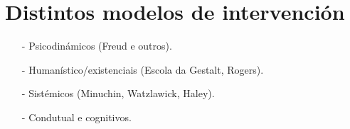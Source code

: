 \documentclass[a4paper,11pt]{article}
\begin{document}
\section{Distintos modelos de intervención}
\begin{itemize}
	\item[-] Psicodinámicos (Freud e outros).
	\item[-] Humanístico/existenciais (Escola da Gestalt, Rogers).
	\item[-] Sistémicos (Minuchin, Watzlawick, Haley).
	\item[-] Condutual e cognitivos.
\end{itemize}
\end{document}
